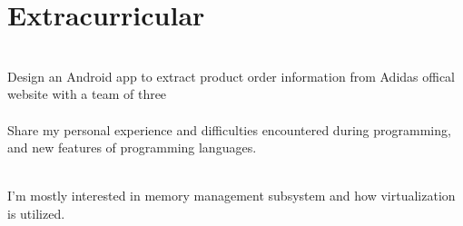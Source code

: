 \documentclass[]{deedy-resume-openfont}
\begin{document}
\section{Extracurricular}
\hfill {} \\
Design an Android app to extract product order information from Adidas offical website with a team of three\\
\sectionsep
{} \hfill {} \\
Share my personal experience and difficulties encountered during programming, and new features of programming languages.
\sectionsep

 \\
I'm mostly interested in memory management subsystem and how virtualization is utilized.\\
\end{document}
